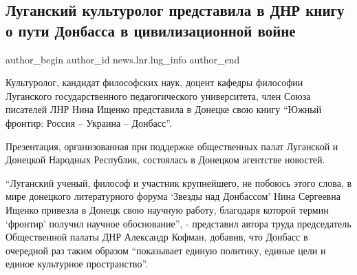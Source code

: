  
 
 
 
 
\subsection{Луганский культуролог представила в ДНР книгу о пути Донбасса в цивилизационной войне}
\label{sec:21_01_2022.stz.news.lnr.lug_info.1.kniga_donbass_nina_ischenko_kulturolog}
 
\ifcmt
 author_begin
   author_id news.lnr.lug_info
 author_end
\fi

Культуролог, кандидат философских наук, доцент кафедры философии Луганского
государственного педагогического университета, член Союза писателей ЛНР Нина
Ищенко представила в Донецке свою книгу \enquote{Южный фронтир: Россия – Украина –
Донбасс}.


Презентация, организованная при поддержке общественных палат Луганской и
Донецкой Народных Республик, состоялась в Донецком агентстве новостей.

\enquote{Луганский ученый, философ и участник крупнейшего, не побоюсь этого слова, в
мире донецкого литературного форума \enquote{Звезды над Донбассом} Нина Сергеевна
Ищенко привезла в Донецк свою научную работу, благодаря которой термин
\enquote{фронтир} получил научное обоснование}, - представил автора труда председатель
Общественной палаты ДНР Александр Кофман, добавив, что Донбасс в очередной раз
таким образом \enquote{показывает единую политику, единые цели и единое культурное
пространство}.


